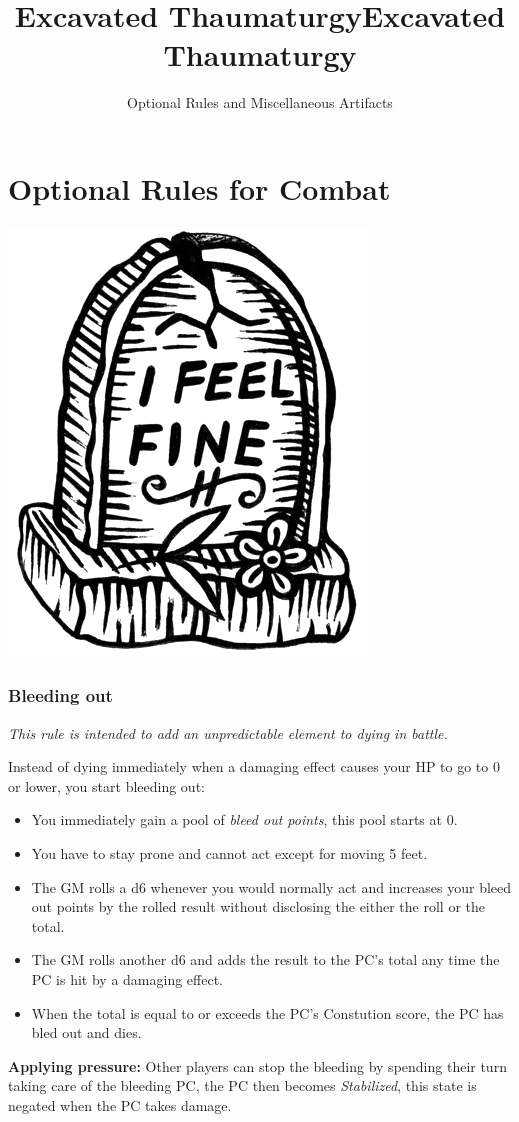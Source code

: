 \documentclass[letterpaper,sansserif,tightsqueeze]{rpg-module}
\title{Excavated Thaumaturgy}
\begin{document}
\twocolumn

\title{Excavated Thaumaturgy}

\subtitle{Optional Rules and Miscellaneous Artifacts}




\maketitle

\hyphenchar{}
\renewcommand{\arraystretch}{1.4}

\vspace{0.5cm}
\part*{Optional Rules for Combat}
\vspace{0.5cm}

\begin{center}
	\includegraphics[width = 0.3\linewidth]{dead.png}
\end{center}
\section{Bleeding out}
\textit{This rule is intended to add an unpredictable element to dying in battle.}

Instead of dying immediately when a damaging effect causes your HP to go to 0 or lower, you start bleeding out:
\begin{itemize}
	\item You immediately gain a pool of \textit{bleed out points}, this pool starts at 0.
	\item You have to stay prone and cannot act except for moving 5 feet.
	\item The GM rolls a d6 whenever you would normally act and increases your bleed out points by the rolled result without disclosing the either the roll or the total.
	\item The GM rolls another d6 and adds the result to the PC's total any time the PC is hit by a damaging effect.
	\item When the total is equal to or exceeds the PC's Constution score, the PC has bled out and dies.
\end{itemize}
\textbf{Applying pressure:} Other players can stop the bleeding by spending their turn taking care of the bleeding PC, the PC then becomes \textit{Stabilized}, this state is negated when the PC takes damage.
\end{document}

